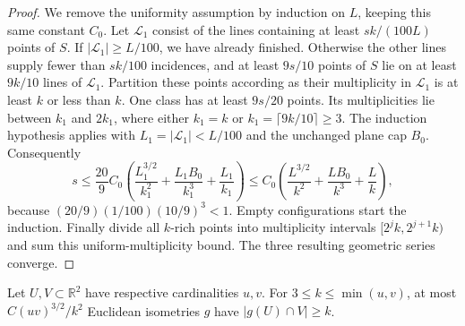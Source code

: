 \begin{proof}
We remove the uniformity assumption by induction on $L$, keeping this
same constant $C_0$.  Let $\mathcal L_1$ consist of the lines containing
at least $sk/(100L)$ points of $S$.  If $|\mathcal L_1|\ge L/100$,
we have already finished.  Otherwise the other lines supply fewer
than $sk/100$ incidences, and at least $9s/10$ points of $S$ lie on
at least $9k/10$ lines of $\mathcal L_1$.  Partition these points
according as their multiplicity in $\mathcal L_1$ is at least $k$ or
less than $k$.  One class has at least $9s/20$ points.  Its
multiplicities lie between $k_1$ and $2k_1$, where either $k_1=k$ or
$k_1=\lceil9k/10\rceil\ge3$.  The induction hypothesis applies with
$L_1=|\mathcal L_1|<L/100$ and the unchanged plane cap $B_0$.
Consequently
\[
 s\le\frac{20}{9}C_0
 \left(\frac{L_1^{3/2}}{k_1^2}
                  +\frac{L_1B_0}{k_1^3}+\frac{L_1}{k_1}\right)
 \le C_0\left(\frac{L^{3/2}}{k^2}
                  +\frac{LB_0}{k^3}+\frac Lk\right),
\]
because $(20/9)(1/100)(10/9)^3<1$.  Empty configurations start the
induction.  Finally divide all $k$-rich points into multiplicity
intervals $[2^jk,2^{j+1}k)$ and sum this uniform-multiplicity bound.
The three resulting geometric series converge.
\end{proof}

\begin{corollary}\label{ci:planar-motions}
Let $U,V\subset\mathbb R^2$ have respective cardinalities $u,v$.
For $3\le k\le\min(u,v)$, at most $C(uv)^{3/2}/k^2$ Euclidean
isometries $g$ have $|g(U)\cap V|\ge k$.
\end{corollary}


